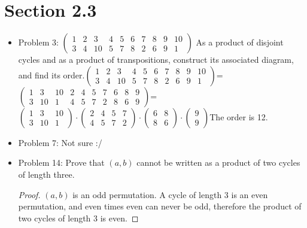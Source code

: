 \documentclass[hidelinks,12pt]{article}
\begin{document}
\section{Section 2.3}
\begin{itemize}
    \item Problem 3: $\left(\begin{smallmatrix} 
1&2&3&4&5&6&7&8&9&10\\
3&4&10&5&7&8&2&6&9&1
\end{smallmatrix}\right)$ As a product of disjoint cycles and as a product of transpositions, construct its associated diagram, and find its order.\newline $\left(\begin{smallmatrix} 
1&2&3&4&5&6&7&8&9&10\\
3&4&10&5&7&8&2&6&9&1
\end{smallmatrix}\right)$=$\left(\begin{smallmatrix} 
1&3&10&2&4&5&7&6&8&9\\
3&10&1&4&5&7&2&8&6&9
\end{smallmatrix}\right)$=$\left(\begin{smallmatrix} 
1&3&10\\
3&10&1
\end{smallmatrix}\right)\cdot\left(\begin{smallmatrix} 
2&4&5&7\\
4&5&7&2
\end{smallmatrix}\right)\cdot\left(\begin{smallmatrix} 
6&8\\
8&6
\end{smallmatrix}\right)\cdot\left(\begin{smallmatrix} 
9\\
9
\end{smallmatrix}\right)$\newline{}\newline The order is 12.
    \item Problem 7: Not sure :/
    \item Problem 14: Prove that $(a,b)$ cannot be written as a product of two cycles of length three. \begin{proof}
    $(a,b)$ is an odd permutation. A cycle of length 3 is an even permutation, and even times even can never be odd, therefore the product of two cycles of length 3 is even.
    \end{proof}
\end{itemize}
\end{document}
